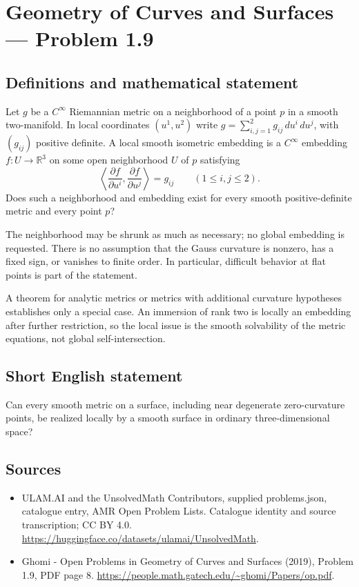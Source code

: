 \documentclass[11pt,a4paper]{article}
\begin{document}
\section*{Geometry of Curves and Surfaces — Problem 1.9}\label{statement}

\subsection{Definitions and mathematical statement}
Let $g$ be a $C^\infty$ Riemannian metric on a neighborhood of
a point $p$ in a smooth two-manifold. In local coordinates
$(u^1,u^2)$ write $g=\sum_{i,j=1}^2g_{ij}\,du^i\,du^j$, with
$(g_{ij})$ positive definite. A local smooth isometric embedding
is a $C^\infty$ embedding $f:U\to\mathbb R^3$ on some open
neighborhood $U$ of $p$ satisfying
\[
        \left\langle\frac{\partial f}{\partial u^i},
                       \frac{\partial f}{\partial u^j}\right\rangle
                         =g_{ij}\qquad(1\le i,j\le2).
\]
Does such a neighborhood and embedding exist for every smooth
positive-definite metric and every point $p$?

The neighborhood may be shrunk as much as necessary; no global
embedding is requested. There is no assumption that the Gauss
curvature is nonzero, has a fixed sign, or vanishes to finite
order. In particular, difficult behavior at flat points is part
of the statement.

A theorem for analytic metrics or metrics with additional
curvature hypotheses establishes only a special case. An
immersion of rank two is locally an embedding after further
restriction, so the local issue is the smooth solvability of
the metric equations, not global self-intersection.
\subsection{Short English statement}
Can every smooth metric on a surface, including near degenerate
zero-curvature points, be realized locally by a smooth surface
in ordinary three-dimensional space?
\subsection{Sources}
\begin{itemize}
\item[S1] ULAM.AI and the UnsolvedMath Contributors, supplied problems.json, catalogue entry, AMR Open Problem Lists. Catalogue identity and source transcription; CC BY 4.0.
\url{https://huggingface.co/datasets/ulamai/UnsolvedMath}.
\item[S2] Ghomi - Open Problems in Geometry of Curves and Surfaces (2019), Problem 1.9, PDF page 8. 
\url{https://people.math.gatech.edu/~ghomi/Papers/op.pdf}.
\end{itemize}
\end{document}
